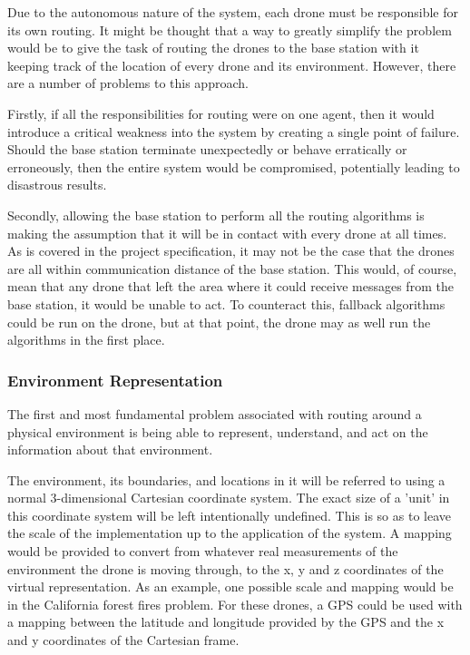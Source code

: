 Due to the autonomous nature of the system, each drone must be responsible for its own routing. It might be thought that a way to greatly simplify the problem would be to give the task of routing the drones to the base station with it keeping track of the location of every drone and its environment. However, there are a number of problems to this approach.

Firstly, if all the responsibilities for routing were on one agent, then it would introduce a critical weakness into the system by creating a single point of failure. Should the base station terminate unexpectedly or behave erratically or erroneously, then the entire system would be compromised, potentially leading to disastrous results.

Secondly, allowing the base station to perform all the routing algorithms is making the assumption that it will be in contact with every drone at all times. As is covered in the project specification, it may not be the case that the drones are all within communication distance of the base station. This would, of course, mean that any drone that left the area where it could receive messages from the base station, it would be unable to act. To counteract this, fallback algorithms could be run on the drone, but at that point, the drone may as well run the algorithms in the first place.

		\subsubsection{Environment Representation}
		
The first and most fundamental problem associated with routing around a physical environment is being able to represent, understand, and act on the information about that environment.

The environment, its boundaries, and locations in it will be referred to using a normal 3-dimensional Cartesian coordinate system. The exact size of a 'unit' in this coordinate system will be left intentionally undefined. This is so as to leave the scale of the implementation up to the application of the system. A mapping would be provided to convert from whatever real measurements of the environment the drone is moving through, to the x, y and z coordinates of the virtual representation. As an example, one possible scale and mapping would be in the California forest fires problem. For these drones, a GPS could be used with a mapping between the latitude and longitude provided by the GPS and the x and y coordinates of the Cartesian frame.


